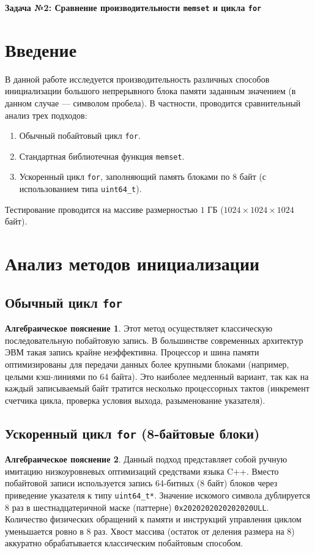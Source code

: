 \documentclass[12pt, a4paper]{article}
\theoremstyle{definition}
\newtheorem*{alg}{Алгебраическое пояснение}
\begin{document}
\begin{center}
    \Large\bfseries Задача №2: Сравнение производительности \texttt{memset} и цикла \texttt{for} \\
\end{center}

\vspace{0.5cm}

\section{Введение}
В данной работе исследуется производительность различных способов инициализации большого непрерывного блока памяти заданным значением (в данном случае --- символом пробела). В частности, проводится сравнительный анализ трех подходов:
\begin{enumerate}
    \item Обычный побайтовый цикл \texttt{for}.
    \item Стандартная библиотечная функция \texttt{memset}.
    \item Ускоренный цикл \texttt{for}, заполняющий память блоками по 8 байт (с использованием типа \texttt{uint64\_t}).
\end{enumerate}
Тестирование проводится на массиве размерностью $1$ ГБ ($1024 \times 1024 \times 1024$ байт).

\section{Анализ методов инициализации}

\subsection{Обычный цикл \texttt{for}}
\begin{alg}
Этот метод осуществляет классическую последовательную побайтовую запись. В большинстве современных архитектур ЭВМ такая запись крайне неэффективна. Процессор и шина памяти оптимизированы для передачи данных более крупными блоками (например, целыми кэш-линиями по 64 байта). Это наиболее медленный вариант, так как на каждый записываемый байт тратится несколько процессорных тактов (инкремент счетчика цикла, проверка условия выхода, разыменование указателя).
\end{alg}

\subsection{Ускоренный цикл \texttt{for} (8-байтовые блоки)}
\begin{alg}
Данный подход представляет собой ручную имитацию низкоуровневых оптимизаций средствами языка C++. Вместо побайтовой записи используется запись 64-битных (8 байт) блоков через приведение указателя к типу \texttt{uint64\_t*}. Значение искомого символа дублируется 8 раз в шестнадцатеричной маске (паттерне) \texttt{0x2020202020202020ULL}. Количество физических обращений к памяти и инструкций управления циклом уменьшается ровно в 8 раз. Хвост массива (остаток от деления размера на 8) аккуратно обрабатывается классическим побайтовым способом.
\end{alg}
\end{document}
